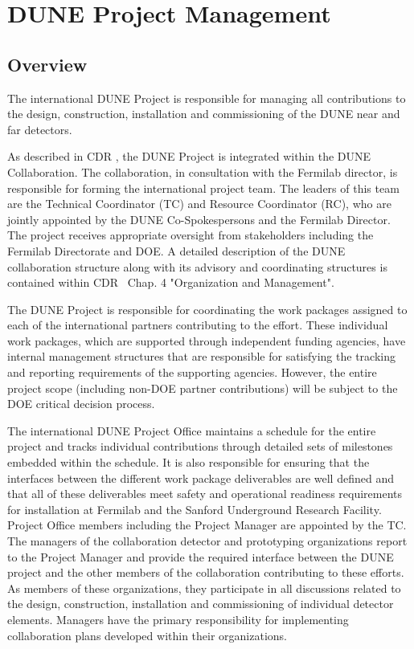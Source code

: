 \chapter{DUNE Project Management}
\label{ch:detectors-pm}

\section{Overview}

The international DUNE Project is responsible for managing all
contributions to the design, construction, installation and
commissioning of the DUNE near and far detectors.

As described in CDR \volintro, the DUNE Project is integrated within the
DUNE Collaboration.  The collaboration, in consultation with the
Fermilab director, is responsible for forming the international
project team.  The leaders of this team are the Technical Coordinator
(TC) and Resource Coordinator (RC), who are jointly appointed by the
DUNE Co-Spokespersons and the Fermilab Director.  The project receives
appropriate oversight from stakeholders including the Fermilab
Directorate and DOE.  A detailed description of the DUNE collaboration
structure along with its advisory and coordinating structures is
contained within CDR \volintro\ Chap. 4 "Organization and Management".

The DUNE Project is responsible for coordinating the work
packages assigned to each of the international partners contributing
to the effort.  These individual work packages, which are supported
through independent funding agencies, have internal management
structures that are responsible for satisfying the tracking and
reporting requirements of the supporting agencies.  However, the
entire project scope (including non-DOE partner contributions) will be
subject to the DOE critical decision process.

The international DUNE Project Office maintains a schedule for the
entire project and tracks individual contributions through detailed
sets of milestones embedded within the schedule.  It is also responsible
for ensuring that the interfaces between the different work package
deliverables are well defined and that all of these deliverables meet
safety and operational readiness requirements for installation at
Fermilab and the Sanford Underground Research Facility.  Project
Office members including the Project Manager are appointed by the TC.
The managers of the collaboration detector and prototyping
organizations report to the Project Manager and provide the required
interface between the DUNE project and the other members of the
collaboration contributing to these efforts.  As members of these
organizations, they participate in all discussions related to the
design, construction, installation and commissioning of individual
detector elements.  Managers have the primary responsibility for
implementing collaboration plans developed within their organizations.
 
